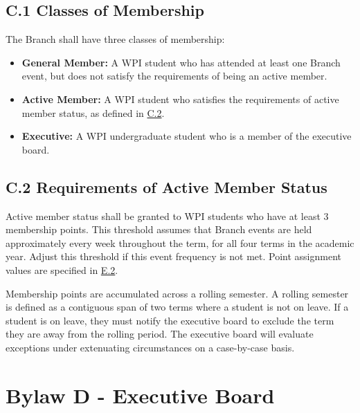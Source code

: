 \documentclass[11pt,a4paper]{article}
\begin{document}
\subsection*{C.1 Classes of Membership}
The Branch shall have three classes of membership:
\begin{itemize}[noitemsep]
    \item \textbf{General Member:} A WPI student who has attended at least one Branch event, but does not satisfy the requirements of being an active member.
    \item \textbf{Active Member:} A WPI student who satisfies the requirements of active member status, as defined in \hyperref[C.2]{C.2}.
    \item \textbf{Executive:} A WPI undergraduate student who is a member of the executive board.
\end{itemize}

\subsection*{C.2 Requirements of 
Active Member Status}
\label{C.2}
Active member status shall be granted to WPI students who have at least 3 membership points. This threshold assumes that Branch events are held approximately every week throughout the term, for all four terms in the academic year. Adjust this threshold if this event frequency is not met. Point assignment values are specified in \hyperref[E.2]{E.2}.

Membership points are accumulated across a rolling semester. A rolling semester is defined as a contiguous span of two terms where a student is not on leave. If a student is on leave, they must notify the executive board to exclude the term they are away from the rolling period. The executive board will evaluate exceptions under extenuating circumstances on a case-by-case basis.

\section*{Bylaw D - Executive Board}
\end{document}
